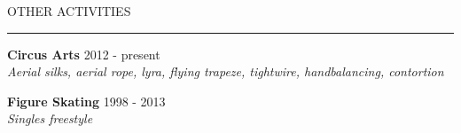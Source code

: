 \documentclass{resume} %
\renewenvironment{rSection}[1]{
\sectionskip
\textcolor{RoyalPurple}{\MakeUppercase{#1}}
\sectionlineskip
\hrule
\begin{list}{}{
\setlength{\leftmargin}{1.5em}
}
\item[]
}{
\end{list}
}
\begin{document}

\begin{rSection}{Other Activities}

{\bf Circus Arts} \hfill 2012 - present \\ 
{\em Aerial silks, aerial rope, lyra, flying trapeze, tightwire, handbalancing, contortion} 

{\bf Figure Skating} \hfill 1998 - 2013 \\ 
{\em Singles freestyle} 

\end{rSection}
\end{document}
